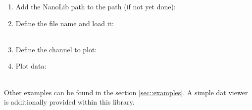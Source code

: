\begin{enumerate}
	\item Add the NanoLib path to the \matlab{} path (if not yet done):\\

	\item Define the file name and load it:\\
	\\
	
	\item Define the channel to plot:\\

	\item Plot data:\\
	\\
	
\end{enumerate}

\noindent Other examples can be found in the section \ref{sec::examples}. A simple dat viewer is additionally provided within this library.\\
